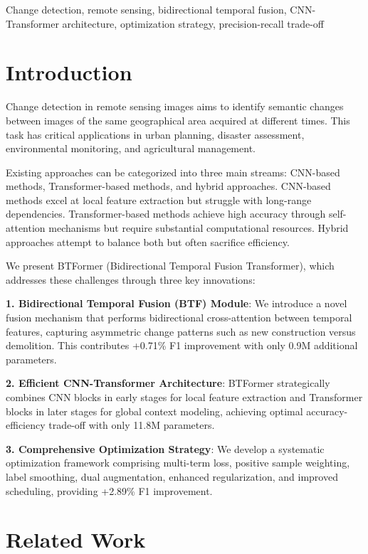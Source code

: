 \documentclass[journal]{IEEEtran}
\begin{document}
\begin{IEEEkeywords}
Change detection, remote sensing, bidirectional temporal fusion, CNN-Transformer architecture, optimization strategy, precision-recall trade-off
\end{IEEEkeywords}

\section{Introduction}

Change detection in remote sensing images aims to identify semantic changes between images of the same geographical area acquired at different times. This task has critical applications in urban planning, disaster assessment, environmental monitoring, and agricultural management.

Existing approaches can be categorized into three main streams: CNN-based methods, Transformer-based methods, and hybrid approaches. CNN-based methods excel at local feature extraction but struggle with long-range dependencies. Transformer-based methods achieve high accuracy through self-attention mechanisms but require substantial computational resources. Hybrid approaches attempt to balance both but often sacrifice efficiency.

We present BTFormer (Bidirectional Temporal Fusion Transformer), which addresses these challenges through three key innovations:

\textbf{1. Bidirectional Temporal Fusion (BTF) Module}: We introduce a novel fusion mechanism that performs bidirectional cross-attention between temporal features, capturing asymmetric change patterns such as new construction versus demolition. This contributes +0.71\% F1 improvement with only 0.9M additional parameters.

\textbf{2. Efficient CNN-Transformer Architecture}: BTFormer strategically combines CNN blocks in early stages for local feature extraction and Transformer blocks in later stages for global context modeling, achieving optimal accuracy-efficiency trade-off with only 11.8M parameters.

\textbf{3. Comprehensive Optimization Strategy}: We develop a systematic optimization framework comprising multi-term loss, positive sample weighting, label smoothing, dual augmentation, enhanced regularization, and improved scheduling, providing +2.89\% F1 improvement.

\section{Related Work}
\end{document}
